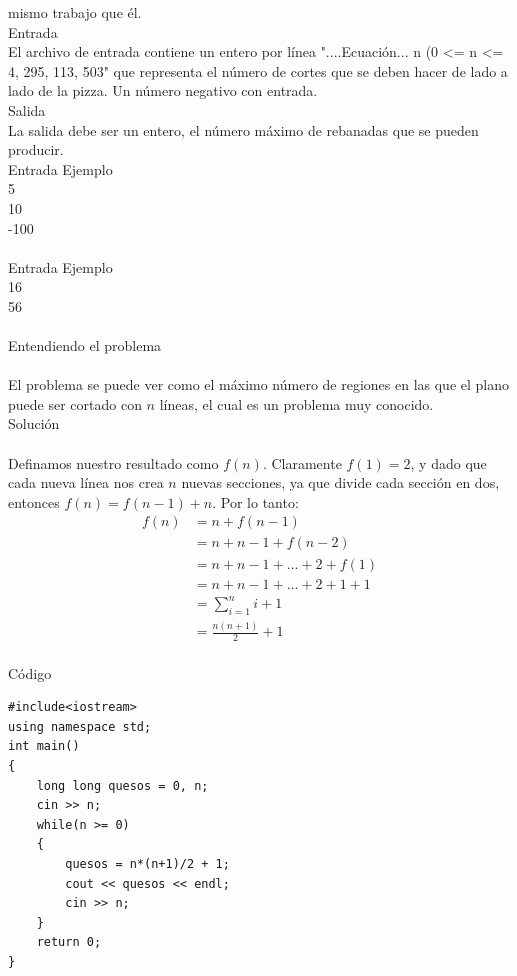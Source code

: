 \documentclass[12pt]{article}
\begin{document}
mismo trabajo que \'el.
\\
\textrm{\large Entrada}
\\
El archivo de entrada contiene un entero por l\'inea "....Ecuación... n (0 <= n <= 4, 295, 113, 503" que representa el n\'umero de
cortes que se deben hacer de lado a lado de la pizza. Un n\'umero negativo con entrada.
\\
\textrm{\large Salida}
\\
La salida debe ser un entero, el n\'umero m\'aximo de rebanadas que se pueden producir.
\\
\textrm{\large Entrada Ejemplo}
\\
5\\
10\\
-100\\
\\
\textrm{\large Entrada Ejemplo}
\\
16\\
56\\
\\
\textrm{\large Entendiendo el problema}\\
\\El problema se puede ver como el máximo número de regiones en las que el plano puede ser cortado con $n$ líneas, el cual es un problema muy conocido.\\ 

\textrm{\large Solución}\\
\\Definamos nuestro resultado como $f(n)$. Claramente $f(1) = 2$, y dado que cada nueva línea nos crea $n$ nuevas secciones, ya que divide cada sección en dos, entonces $f(n) = f(n-1) + n$.
Por lo tanto:
\begin{align*}
f(n) & = n + f(n-1) \\
     & = n + n-1 + f(n-2) \\
     & = n + n-1 + ... + 2 + f(1) \\
     & = n + n-1 + ... + 2 + 1 + 1 \\
     & = \sum_{i = 1}^n i + 1 \\
     & = \frac{n(n+1)}{2} + 1
\end{align*}\\
\textrm{\large Código}\\
\begin{verbatim}
#include<iostream>
using namespace std;
int main()
{
    long long quesos = 0, n;
    cin >> n;
    while(n >= 0)
    {
        quesos = n*(n+1)/2 + 1;
        cout << quesos << endl;
        cin >> n;
    }
    return 0;
}
\end{verbatim}
\end{document}
